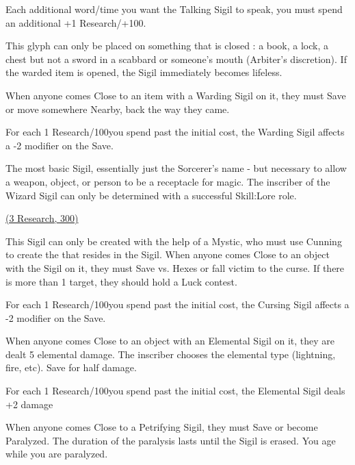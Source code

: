 {Each additional word/time you want the Talking Sigil to speak, you must spend an additional +1 Research/+100\FE.



This glyph can only be placed on something that is closed : a book, a lock, a chest but not a sword in a scabbard or someone's mouth (Arbiter's discretion).  If the warded item is opened, the Sigil immediately becomes lifeless.

When anyone comes Close to an item with a Warding Sigil on it, they must Save or move somewhere Nearby, back the way they came.  

For each 1 Research/100\FE you spend past the initial cost, the Warding Sigil affects a -2 modifier on the Save.



The most basic Sigil, essentially just the Sorcerer's name - but necessary to allow a weapon, object, or person to be a receptacle for magic.  The inscriber of the Wizard Sigil can only be determined with a successful Skill:Lore role.


\large{\underline{ (3 Research, 300\AG)}}\normalsize


This Sigil can only be created with the help of a Mystic, who must use Cunning to create the  that resides in the Sigil.  When anyone comes Close to an object with the Sigil on it, they must Save vs. Hexes or fall victim to the curse. If there is more than 1 target, they should hold a Luck contest.

For each 1 Research/100\AG you spend past the initial cost, the Cursing Sigil affects a -2 modifier on the Save.



When anyone comes Close to an object with an Elemental Sigil on it, they are dealt 5 elemental damage.  The inscriber chooses the elemental type (lightning, fire, etc).  Save for half damage.

For each 1 Research/100\AG you spend past the initial cost, the Elemental Sigil deals +2 damage



When anyone comes Close to a Petrifying Sigil, they must Save or become Paralyzed.  The duration of the paralysis lasts until the Sigil is erased. You age while you are paralyzed.

}
